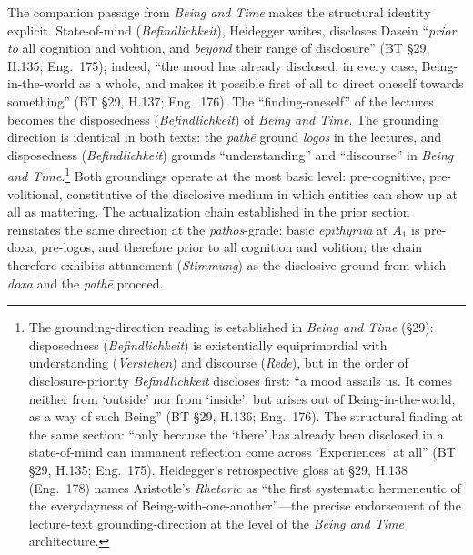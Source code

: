  The companion passage from \textit{Being and Time} makes the structural identity explicit. State-of-mind (\textit{Befindlichkeit}), Heidegger writes, discloses Dasein ``\textit{prior to} all cognition and volition, and \textit{beyond} their range of disclosure'' (BT \S29, H.135; Eng.~175); indeed, ``the mood has already disclosed, in every case, Being-in-the-world as a whole, and makes it possible first of all to direct oneself towards something'' (BT \S29, H.137; Eng.~176). The ``finding-oneself'' of the lectures becomes the disposedness (\textit{Befindlichkeit}) of \textit{Being and Time}. The grounding direction is identical in both texts: the \textit{pathē} ground \textit{logos} in the lectures, and disposedness (\textit{Befindlichkeit}) grounds ``understanding'' and ``discourse'' in \textit{Being and Time}.\footnote{The grounding-direction reading is established in \textit{Being and Time} (\S 29): disposedness (\textit{Befindlichkeit}) is existentially equiprimordial with understanding (\textit{Verstehen}) and discourse (\textit{Rede}), but in the order of disclosure-priority \textit{Befindlichkeit} discloses first: ``a mood assails us. It comes neither from `outside' nor from `inside', but arises out of Being-in-the-world, as a way of such Being'' (BT \S 29, H.136; Eng.~176). The structural finding at the same section: ``only because the `there' has already been disclosed in a state-of-mind can immanent reflection come across `Experiences' at all'' (BT \S 29, H.135; Eng.~175). Heidegger's retrospective gloss at \S 29, H.138 (Eng.~178) names Aristotle's \textit{Rhetoric} as ``the first systematic hermeneutic of the everydayness of Being-with-one-another''---the precise endorsement of the lecture-text grounding-direction at the level of the \textit{Being and Time} architecture.} Both groundings operate at the most basic level: pre-cognitive, pre-volitional, constitutive of the disclosive medium in which entities can show up at all as mattering. The actualization chain established in the prior section reinstates the same direction at the \textit{pathos}-grade: basic \textit{epithymia} at $A_1$ is pre-doxa, pre-logos, and therefore prior to all cognition and volition; the chain therefore exhibits attunement (\textit{Stimmung}) as the disclosive ground from which \textit{doxa} and the \textit{pathē} proceed.


